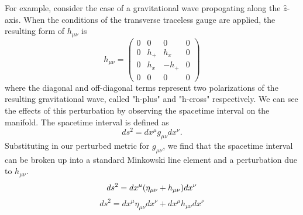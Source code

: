 For example, consider the case of a gravitational 
wave propogating along the $\hat{z}$-axis.
When the conditions of the transverse traceless gauge are applied, 
the resulting form of $h_{\mu\nu}$ is 
\begin{equation}
h_{\mu\nu} = 
  \begin{pmatrix}
    0 & 0 & 0 & 0 \\
    0 & h_+ & h_x & 0 \\
    0 & h_x & -h_+ & 0 \\
    0 & 0 & 0 & 0
  \end{pmatrix}
\end{equation}
where the diagonal and off-diagonal terms represent two polarizations 
of the resulting gravitational wave, called "h-plus" and "h-cross" 
respectively.
We can see the effects of this perturbation by observing the  
spacetime interval on the manifold. The spacetime interval is defined as 
\begin{equation}
ds^2 = dx^\mu g_{\mu\nu}dx^\nu.
\end{equation}
Substituting in our perturbed metric for $g_{\mu\nu}$, we find that 
the spacetime interval can be broken up into a standard Minkowski line 
element and a perturbation due to $h_{\mu\nu}$.
\begin{equation}
ds^2 = dx^\mu (\eta_{\mu\nu} + h_{\mu\nu})dx^\nu \\
\end{equation}
\begin{equation}
ds^2 = dx^\mu \eta_{\mu\nu} dx^\nu + dx^\mu h_{\mu\nu}dx^\nu
\label{eq:spacetime}
\end{equation}

